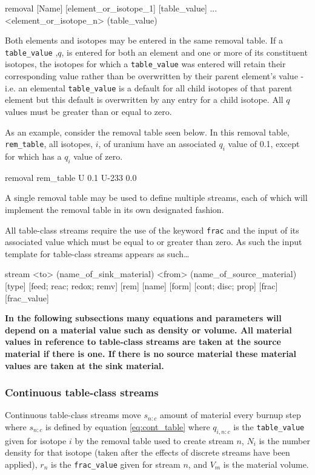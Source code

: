\begin{lt}
removal [Name]
[element_or_isotope_1] [table_value]
...
<element_or_isotope_n> (table_value) 
\end{lt}

Both elements and isotopes may be entered in the same removal table. If a 
\texttt{table\_value} ,$q$, is entered for both an element and one or more of 
its constituent isotopes, the isotopes for which a \texttt{table\_value} was 
entered will retain their corresponding value rather than be overwritten by 
their parent element's value - i.e. an elemental \texttt{table\_value} is a 
default
for all child isotopes of that parent element but this default is overwritten
by any entry for a child isotope. All $q$ values must be greater than or equal
to zero.

As an example, consider the removal table seen below. In this removal table,
\texttt{rem\_table}, all isotopes, $i$, of uranium have an associated 
$q_{i}$ value of 0.1, except for  which has a $q_{i}$ value of zero.

\begin{li}
removal rem_table
U     0.1
U-233 0.0
\end{li}

A single removal table may be used to define multiple streams, each of which
will implement the removal table in its own designated fashion.

All table-class streams require the use of the keyword \texttt{frac} and the
input of its associated value which must be equal to or greater than zero. 
As such the input template for table-class streams appears as such\ldots

\begin{lt}
stream <to> (name_of_sink_material) <from> (name_of_source_material)
    [type] [{feed; reac; redox; remv}] [rem] [name] 
    [form] [{cont; disc; prop}] [frac] [frac_value]
\end{lt}

\textbf{In the following subsections many equations and parameters will depend on a
material value such as density or volume. All material values in reference to
table-class streams are taken at the source material if there is one. If there
is no source material these material values are taken at the sink material.}

\subsubsection{Continuous table-class streams}\label{sssec:crem}
Continuous table-class streams move $s_{n:c}$ amount of material every burnup
step where $s_{n:c}$ is defined by equation \ref{eq:cont_table} where
$q_{i,n:c}$ is the \texttt{table\_value} given for isotope $i$ by the removal
table used to create stream $n$, $N_{i}$ is the number density for that isotope 
(taken after the effects of discrete streams have been applied), $r_{n}$ 
is the \texttt{frac\_value} given for stream $n$, and $V_{m}$ is the material
volume. 

